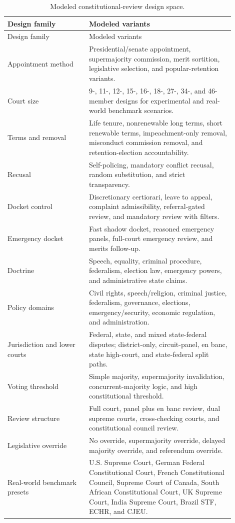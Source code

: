 \documentclass[
  journal=small,
  manuscript=research-article,
  year=2026
]{cup-journal}
\begin{document}
\begin{longtable}{p{0.32\linewidth}p{0.58\linewidth}}
\caption{Modeled constitutional-review design space.}
\label{tab:design-space}\\
\toprule
Design family & Modeled variants \\
\midrule
\endfirsthead
\toprule
Design family & Modeled variants \\
\midrule
\endhead
Appointment method & Presidential/senate appointment, supermajority commission, merit sortition, legislative selection, and popular-retention variants. \\
Court size & 9-, 11-, 12-, 15-, 16-, 18-, 27-, 34-, and 46-member designs for experimental and real-world benchmark scenarios. \\
Terms and removal & Life tenure, nonrenewable long terms, short renewable terms, impeachment-only removal, misconduct commission removal, and retention-election accountability. \\
Recusal & Self-policing, mandatory conflict recusal, random substitution, and strict transparency. \\
Docket control & Discretionary certiorari, leave to appeal, complaint admissibility, referral-gated review, and mandatory review with filters. \\
Emergency docket & Fast shadow docket, reasoned emergency panels, full-court emergency review, and merits follow-up. \\
Doctrine & Speech, equality, criminal procedure, federalism, election law, emergency powers, and administrative state claims. \\
Policy domains & Civil rights, speech/religion, criminal justice, federalism, governance, elections, emergency/security, economic regulation, and administration. \\
Jurisdiction and lower courts & Federal, state, and mixed state-federal disputes; district-only, circuit-panel, en banc, state high-court, and state-federal split paths. \\
Voting threshold & Simple majority, supermajority invalidation, concurrent-majority logic, and high constitutional threshold. \\
Review structure & Full court, panel plus en banc review, dual supreme courts, cross-checking courts, and constitutional council review. \\
Legislative override & No override, supermajority override, delayed majority override, and referendum override. \\
Real-world benchmark presets & U.S. Supreme Court, German Federal Constitutional Court, French Constitutional Council, Supreme Court of Canada, South African Constitutional Court, UK Supreme Court, India Supreme Court, Brazil STF, ECHR, and CJEU. \\

\end{longtable}
\end{document}

